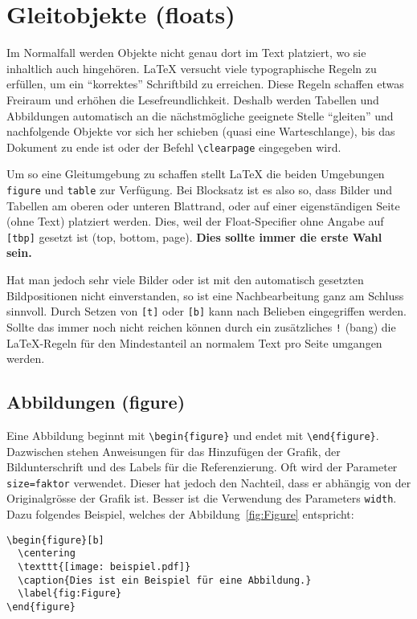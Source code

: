 \section{Gleitobjekte (floats)}
Im Normalfall werden Objekte nicht genau dort im Text platziert, wo sie inhaltlich auch hingehören. \LaTeX{} versucht viele typographische Regeln zu erfüllen, um ein \enquote{korrektes} Schriftbild zu erreichen. Diese Regeln schaffen etwas Freiraum und erhöhen die Lesefreundlichkeit. Deshalb werden Tabellen und Abbildungen automatisch an die nächstmögliche geeignete Stelle \enquote{gleiten} und nachfolgende Objekte vor sich her schieben (quasi eine Warteschlange), bis das Dokument zu ende ist oder der Befehl \verb|\clearpage| eingegeben wird.

Um so eine Gleitumgebung zu schaffen stellt \LaTeX{} die beiden Umgebungen \texttt{figure} und \texttt{table} zur Verfügung. Bei Blocksatz ist es also so, dass Bilder und Tabellen am oberen oder unteren Blattrand, oder auf einer eigenständigen Seite (ohne Text) platziert werden. Dies, weil der Float-Specifier ohne Angabe auf \texttt{[tbp]} gesetzt ist (top, bottom, page). \textbf{Dies sollte immer die erste Wahl sein.}

Hat man jedoch sehr viele Bilder oder ist mit den automatisch gesetzten Bildpositionen nicht einverstanden, so ist eine Nachbearbeitung ganz am Schluss sinnvoll.
Durch Setzen von \texttt{[t]} oder \texttt{[b]} kann nach Belieben eingegriffen werden.
Sollte das immer noch nicht reichen können durch ein zusätzliches \texttt{!} (bang) die \LaTeX-Regeln für den Mindestanteil an normalem Text pro Seite umgangen werden.

\subsection{Abbildungen (figure)}
Eine Abbildung beginnt mit \verb|\begin{figure}| und endet mit \verb|\end{figure}|.
Dazwischen stehen Anweisungen für das Hinzufügen der Grafik, der Bildunterschrift und des Labels für die Referenzierung. Oft wird der Parameter \texttt{size=faktor} verwendet. Dieser hat jedoch den Nachteil, dass er abhängig von der Originalgrösse der Grafik ist. Besser ist die Verwendung des Parameters \texttt{width}. Dazu folgendes Beispiel, welches der Abbildung~\ref{fig:Figure} entspricht:

\begin{verbatim}
\begin{figure}[b]
  \centering
  \texttt{[image: beispiel.pdf]}
  \caption{Dies ist ein Beispiel für eine Abbildung.}
  \label{fig:Figure}
\end{figure}
\end{verbatim}

